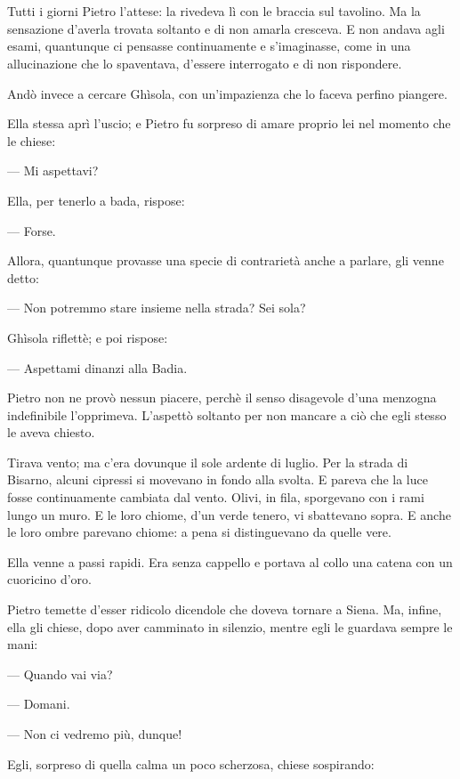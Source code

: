 \chapter{}

Tutti i giorni Pietro l'attese: la rivedeva lì con le braccia sul tavolino. Ma la sensazione d'averla trovata soltanto e di non amarla cresceva. E non andava agli esami, quantunque ci pensasse continuamente e s'imaginasse, come in una allucinazione che lo spaventava, d'essere interrogato e di non rispondere.

Andò invece a cercare Ghìsola, con un'impazienza che lo faceva perfino piangere.

Ella stessa aprì l'uscio; e Pietro fu sorpreso di amare proprio lei nel momento che le chiese:

— Mi aspettavi?

Ella, per tenerlo a bada, rispose:

— Forse.

Allora, quantunque provasse una specie di contrarietà anche a parlare, gli venne detto:

— Non potremmo stare insieme nella strada? Sei sola?

Ghìsola riflettè; e poi rispose:

— Aspettami dinanzi alla Badia.

Pietro non ne provò nessun piacere, perchè il senso disagevole d’una menzogna indefinibile l’opprimeva. L’aspettò soltanto per non mancare a ciò che egli stesso le aveva chiesto.

Tirava vento; ma c’era dovunque il sole ardente di luglio. Per la strada di Bisarno, alcuni cipressi si movevano in fondo alla svolta. E pareva che la luce fosse continuamente cambiata dal vento. Olivi, in fila, sporgevano con i rami lungo un muro. E le loro chiome, d’un verde tenero, vi sbattevano sopra. E anche le loro ombre parevano chiome: a pena si distinguevano da quelle vere.

Ella venne a passi rapidi. Era senza cappello e portava al collo una catena con un cuoricino d’oro.

Pietro temette d’esser ridicolo dicendole che doveva tornare a Siena. Ma, infine, ella gli chiese, dopo aver camminato in silenzio, mentre egli le guardava sempre le mani:

— Quando vai via?

— Domani.

— Non ci vedremo più, dunque!

Egli, sorpreso di quella calma un poco scherzosa, chiese sospirando:

